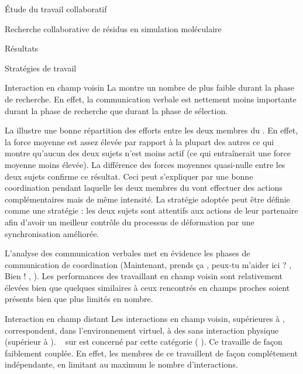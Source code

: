 \documentclass[myfrancais]{mythesis}
\begin{document}
\begin{mypart}{Étude du travail collaboratif}
\begin{mychapter}{Recherche collaborative de résidus en simulation moléculaire}
\begin{mysection}{Résultats}
\begin{mysubsection}{Stratégies de travail}
\begin{mysubsubsection}{Interaction en champ voisin}
						La  montre un nombre de  plus faible durant la phase de recherche.
						En effet, la communication verbale est nettement moins importante durant la phase de recherche que durant la phase de sélection.

						La  illustre une bonne répartition des efforts entre les deux membres du .
						En effet, la force moyenne est assez élevée par rapport à la plupart des autres  ce qui montre qu'aucun des deux sujets n'est moins actif (ce qui entraînerait une force moyenne moins élevée).
						La différence des forces moyennes quasi-nulle entre les deux sujets confirme ce résultat.
						Ceci peut s'expliquer par une bonne coordination pendant laquelle les deux membres du  vont effectuer des actions complémentaires mais de même intensité.
						La stratégie adoptée peut être définie comme une stratégie  : les deux sujets sont attentifs aux actions de leur partenaire afin d'avoir un meilleur contrôle du processus de déformation par une synchronisation améliorée.

						L'analyse des communication verbales met en évidence les phases de communication de coordination (\og Maintenant, prends ça \fg, \og peux-tu m'aider ici ? \fg, \og Bien ! \fg, \myetc).
						Les performances des  travaillant en champ voisin sont relativement élevées bien que quelques  similaires à ceux rencontrés en champs proches soient présents bien que plus limités en nombre.
					\end{mysubsubsection}
					\begin{mysubsubsection}{Interaction en champ distant}
						Les interactions en champ voisin, supérieures à , correspondent, dans l'environnement virtuel, à des  sans interaction physique (supérieur à ).
						~ sur  est concerné par cette catégorie ( ).
						Ce  travaille de façon faiblement couplée.
						En effet, les membres de ce  travaillent de façon complétement indépendante, en limitant au maximum le nombre d'interactions.


\end{mysubsubsection}
\end{mysubsection}
\end{mysection}
\end{mychapter}
\end{mypart}
\end{document}
